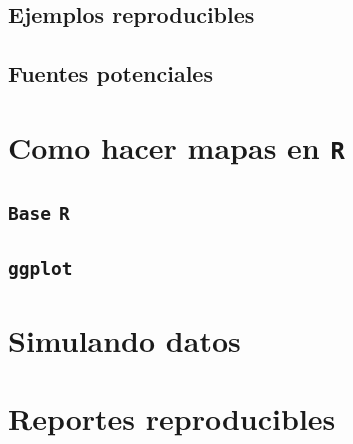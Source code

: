 \documentclass[
]{book}
\begin{document}
\hypertarget{ejemplos-reproducibles}{%
\section{Ejemplos reproducibles}\label{ejemplos-reproducibles}}

\hypertarget{fuentes-potenciales}{%
\section{Fuentes potenciales}\label{fuentes-potenciales}}

\hypertarget{como-hacer-mapas-en-r}{%
\chapter{\texorpdfstring{Como hacer mapas en \texttt{R}}{Como hacer mapas en R}}\label{como-hacer-mapas-en-r}}

\hypertarget{base-r}{%
\section{\texorpdfstring{\texttt{Base} \texttt{R}}{Base R}}\label{base-r}}

\hypertarget{ggplot}{%
\section{\texorpdfstring{\texttt{ggplot}}{ggplot}}\label{ggplot}}

\hypertarget{simulando-datos}{%
\chapter{Simulando datos}\label{simulando-datos}}

\hypertarget{reportes-reproducibles}{%
\chapter{Reportes reproducibles}\label{reportes-reproducibles}}
\end{document}
